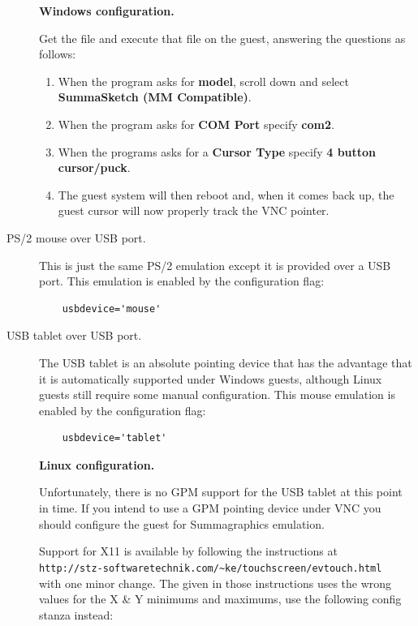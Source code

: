 \documentclass[11pt,twoside,final,openright]{report}
\begin{document}
\begin{description}
\textbf{Windows configuration.}

Get the file
and execute that file on the guest,
answering the questions as follows:

\begin{enumerate}
\item When the program asks for \textbf{model},
scroll down and select \textbf{SummaSketch (MM Compatible)}.

\item When the program asks for \textbf{COM Port} specify \textbf{com2}.

\item When the programs asks for a \textbf{Cursor Type} specify
\textbf{4 button cursor/puck}.

\item The guest system will then reboot and,
when it comes back up,
the guest cursor will now properly track
the VNC pointer.
\end{enumerate}

\item[PS/2 mouse over USB port.]
This is just the same PS/2 emulation except it is
provided over a USB port.
This emulation is enabled by the configuration flag:
{\small
\begin{verbatim}
    usbdevice='mouse'
\end{verbatim}
}

\item[USB tablet over USB port.]
The USB tablet is an absolute pointing device
that has the advantage that it is automatically
supported under Windows guests,
although Linux guests still require some
manual configuration.
This mouse emulation is enabled by the
configuration flag:
{\small
\begin{verbatim}
    usbdevice='tablet'
\end{verbatim}
}

\textbf{Linux configuration.}

Unfortunately,
there is no GPM support for the
USB tablet at this point in time.
If you intend to use a GPM pointing
device under VNC you should
configure the guest for Summagraphics
emulation.

Support for X11 is available by following
the instructions at\\
\verb+http://stz-softwaretechnik.com/~ke/touchscreen/evtouch.html+\\
with one minor change.
The
given in those instructions
uses the wrong values for the X \& Y minimums and maximums,
use the following config stanza instead:


\end{description}
\end{document}
